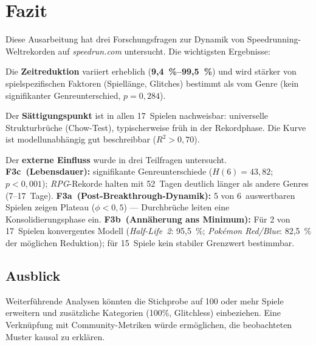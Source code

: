 \chapter{Fazit}
\label{chap:fazit}

Diese Ausarbeitung hat drei Forschungsfragen zur Dynamik von Speedrunning-Weltrekorden auf \textit{speedrun.com} untersucht. Die wichtigsten Ergebnisse:

Die \textbf{Zeitreduktion} variiert erheblich (\textbf{9,4~\%–99,5~\%}) und wird stärker von spielspezifischen Faktoren (Spiellänge, Glitches) bestimmt als vom Genre (kein signifikanter Genreunterschied, $p = 0{,}284$).

Der \textbf{Sättigungspunkt} ist in allen 17~Spielen nachweisbar: universelle Strukturbrüche (Chow-Test), typischerweise früh in der Rekordphase. Die Kurve ist modellunabhängig gut beschreibbar ($R^2 > 0{,}70$).

Der \textbf{externe Einfluss} wurde in drei Teilfragen untersucht. \textbf{F3c~(Lebensdauer):} signifikante Genreunterschiede ($H(6) = 43{,}82$; $p < 0{,}001$); \textit{RPG}-Rekorde halten mit 52~Tagen deutlich länger als andere Genres (7–17~Tage). \textbf{F3a~(Post-Breakthrough-Dynamik):} 5 von 6~auswertbaren Spielen zeigen Plateau ($\phi < 0{,}5$) --- Durchbrüche leiten eine Konsolidierungsphase ein. \textbf{F3b~(Annäherung ans Minimum):} Für 2 von 17~Spielen konvergentes Modell (\textit{Half-Life~2}: 95,5~\%; \textit{Pokémon Red/Blue}: 82,5~\% der möglichen Reduktion); für 15~Spiele kein stabiler Grenzwert bestimmbar.

\section*{Ausblick}

Weiterführende Analysen könnten die Stichprobe auf 100 oder mehr Spiele erweitern und zusätzliche Kategorien (100\%, Glitchless) einbeziehen. Eine Verknüpfung mit Community-Metriken würde ermöglichen, die beobachteten Muster kausal zu erklären.
